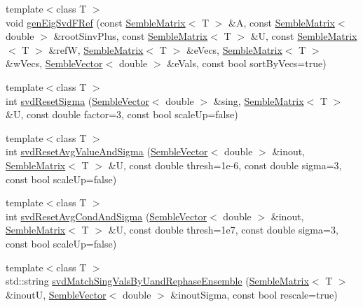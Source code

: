 \begin{DoxyCompactItemize}
\item 
{\footnotesize template$<$class T $>$ }\\void \mbox{\hyperlink{namespaceSEMBLE_ac189f06361cccd1177aff4ded44c28fb}{gen\+Eig\+Svd\+F\+Ref}} (const \mbox{\hyperlink{structSEMBLE_1_1SembleMatrix}{Semble\+Matrix}}$<$ T $>$ \&A, const \mbox{\hyperlink{structSEMBLE_1_1SembleMatrix}{Semble\+Matrix}}$<$ double $>$ \&root\+Sinv\+Plus, const \mbox{\hyperlink{structSEMBLE_1_1SembleMatrix}{Semble\+Matrix}}$<$ T $>$ \&U, const \mbox{\hyperlink{structSEMBLE_1_1SembleMatrix}{Semble\+Matrix}}$<$ T $>$ \&refW, \mbox{\hyperlink{structSEMBLE_1_1SembleMatrix}{Semble\+Matrix}}$<$ T $>$ \&e\+Vecs, \mbox{\hyperlink{structSEMBLE_1_1SembleMatrix}{Semble\+Matrix}}$<$ T $>$ \&w\+Vecs, \mbox{\hyperlink{structSEMBLE_1_1SembleVector}{Semble\+Vector}}$<$ double $>$ \&e\+Vals, const bool sort\+By\+Vecs=true)
\item 
{\footnotesize template$<$class T $>$ }\\int \mbox{\hyperlink{namespaceSEMBLE_a716943d11bf0bdc659ad5ca5834ecf43}{svd\+Reset\+Sigma}} (\mbox{\hyperlink{structSEMBLE_1_1SembleVector}{Semble\+Vector}}$<$ double $>$ \&sing, \mbox{\hyperlink{structSEMBLE_1_1SembleMatrix}{Semble\+Matrix}}$<$ T $>$ \&U, const double factor=3, const bool scale\+Up=false)
\item 
{\footnotesize template$<$class T $>$ }\\int \mbox{\hyperlink{namespaceSEMBLE_a236bc079d6aa849513a7ea270a9116b4}{svd\+Reset\+Avg\+Value\+And\+Sigma}} (\mbox{\hyperlink{structSEMBLE_1_1SembleVector}{Semble\+Vector}}$<$ double $>$ \&inout, \mbox{\hyperlink{structSEMBLE_1_1SembleMatrix}{Semble\+Matrix}}$<$ T $>$ \&U, const double thresh=1e-\/6, const double sigma=3, const bool scale\+Up=false)
\item 
{\footnotesize template$<$class T $>$ }\\int \mbox{\hyperlink{namespaceSEMBLE_a14b6eda564f38c74c1fff912f2747138}{svd\+Reset\+Avg\+Cond\+And\+Sigma}} (\mbox{\hyperlink{structSEMBLE_1_1SembleVector}{Semble\+Vector}}$<$ double $>$ \&inout, \mbox{\hyperlink{structSEMBLE_1_1SembleMatrix}{Semble\+Matrix}}$<$ T $>$ \&U, const double thresh=1e7, const double sigma=3, const bool scale\+Up=false)
\item 
{\footnotesize template$<$class T $>$ }\\std\+::string \mbox{\hyperlink{namespaceSEMBLE_ac29075e3c9639bf5e3983ad36efd4c42}{svd\+Match\+Sing\+Vals\+By\+Uand\+Rephase\+Ensemble}} (\mbox{\hyperlink{structSEMBLE_1_1SembleMatrix}{Semble\+Matrix}}$<$ T $>$ \&inoutU, \mbox{\hyperlink{structSEMBLE_1_1SembleVector}{Semble\+Vector}}$<$ double $>$ \&inout\+Sigma, const bool rescale=true)

\end{DoxyCompactItemize}
